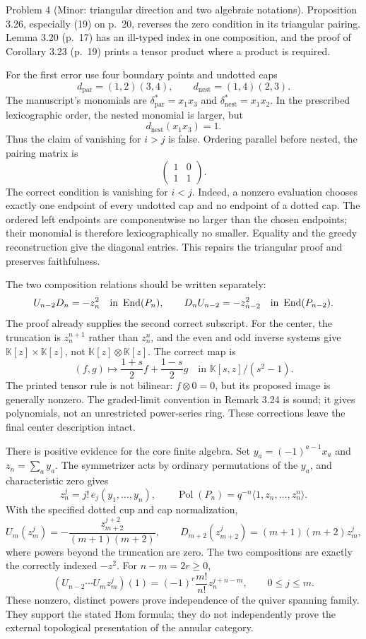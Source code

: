 \documentclass[10pt]{article}
\begin{document}
Problem 4 (Minor: triangular direction and two algebraic notations).  Proposition 3.26, especially (19) on p. 20, reverses the zero condition in its triangular pairing. Lemma 3.20 (p. 17) has an ill-typed index in one composition, and the proof of Corollary 3.23 (p. 19) prints a tensor product where a product is required.\par
For the first error use four boundary points and undotted caps \[d_{\mathrm{par}}=(1,2)(3,4),\qquad
 d_{\mathrm{nest}}=(1,4)(2,3).\] The manuscript’s monomials are \(\delta_{\mathrm{par}}^*=x_1x_3\) and \(\delta_{\mathrm{nest}}^*=x_1x_2\). In the prescribed lexicographic order, the nested monomial is larger, but \[d_{\mathrm{nest}}(x_1x_3)=1.\] Thus the claim of vanishing for \(i>j\) is false. Ordering parallel before nested, the pairing matrix is \[\begin{pmatrix}1&0\\1&1\end{pmatrix}.\] The correct condition is vanishing for \(i<j\). Indeed, a nonzero evaluation chooses exactly one endpoint of every undotted cap and no endpoint of a dotted cap. The ordered left endpoints are componentwise no larger than the chosen endpoints; their monomial is therefore lexicographically no smaller. Equality and the greedy reconstruction give the diagonal entries. This repairs the triangular proof and preserves faithfulness.\par
The two composition relations should be written separately: \[U_{n-2}D_n=-z_n^2\quad\hbox{in }\operatorname{End}(P_n),\qquad
 D_nU_{n-2}=-z_{n-2}^2\quad\hbox{in }\operatorname{End}(P_{n-2}).\] The proof already supplies the second correct subscript. For the center, the truncation is \(z_n^{n+1}\) rather than \(z_n^n\), and the even and odd inverse systems give \(\mathbb K[z]\times\mathbb K[z]\), not \(\mathbb K[z]\otimes\mathbb K[z]\). The correct map is \[(f,g)\longmapsto \frac{1+s}{2}f+\frac{1-s}{2}g
 \quad\text{in }\mathbb K[s,z]/(s^2-1).\] The printed tensor rule is not bilinear: \(f\otimes0=0\), but its proposed image is generally nonzero. The graded-limit convention in Remark 3.24 is sound; it gives polynomials, not an unrestricted power-series ring. These corrections leave the final center description intact.\par
There is positive evidence for the core finite algebra. Set \(y_a=(-1)^{a-1}x_a\) and \(z_n=\sum_a y_a\). The symmetrizer acts by ordinary permutations of the \(y_a\), and characteristic zero gives \[z_n^j=j!\,e_j(y_1,\ldots,y_n),\qquad
 \operatorname{Pol}(P_n)=q^{-n}\langle1,z_n,\ldots,z_n^n\rangle.\] With the specified dotted cup and cap normalization, \[U_m(z_m^j)=-\frac{z_{m+2}^{j+2}}{(m+1)(m+2)},\qquad
 D_{m+2}(z_{m+2}^j)=(m+1)(m+2)z_m^j,\] where powers beyond the truncation are zero. The two compositions are exactly the correctly indexed \(-z^2\). For \(n-m=2r\geq0\), \[(U_{n-2}\cdots U_m z_m^j)(1)
 =(-1)^r\frac{m!}{n!}z_n^{j+n-m},
 \qquad 0\leq j\leq m.\] These nonzero, distinct powers prove independence of the quiver spanning family. They support the stated Hom formula; they do not independently prove the external topological presentation of the annular category.\par
\end{document}
